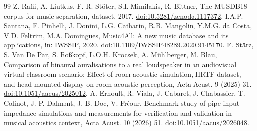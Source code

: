 \documentclass[10pt,a4paper]{article}
\begin{document}
\begin{thebibliography}{99}
 Z. Rafii, A. Liutkus, F.-R. St\"oter, S.I. Mimilakis, R. Bittner, The MUSDB18 corpus for music separation, dataset, 2017. \href{https://doi.org/10.5281/zenodo.1117372}{doi:10.5281/zenodo.1117372}.
 I.A.P. Santana, F. Pinhelli, J. Donini, L.G. Catharin, R.B. Mangolin, Y.M.G. da Costa, V.D. Feltrim, M.A. Domingues, Music4All: A new music database and its applications, in: IWSSIP, 2020. \href{https://doi.org/10.1109/IWSSIP48289.2020.9145170}{doi:10.1109/IWSSIP48289.2020.9145170}.
 F. St\"arz, S. Van De Par, S. Ro\ss kopf, L.O.H. Kroczek, A. M\"{u}hlberger, M. Blau, Comparison of binaural auralisations to a real loudspeaker in an audiovisual virtual classroom scenario: Effect of room acoustic simulation, HRTF dataset, and head-mounted display on room acoustic perception, Acta Acust. 9 (2025) 31. \href{https://doi.org/10.1051/aacus/2025012}{doi:10.1051/aacus/2025012}.
 A. Ernoult, R. Viala, J. Cabaret, J. Chabassier, T. Colinot, J.-P. Dalmont, J.-B. Doc, V. Fr\'eour, Benchmark study of pipe input impedance simulations and measurements for verification and validation in musical acoustics context, Acta Acust. 10 (2026) 51. \href{https://doi.org/10.1051/aacus/2026048}{doi:10.1051/aacus/2026048}.
\end{thebibliography}
\end{document}

